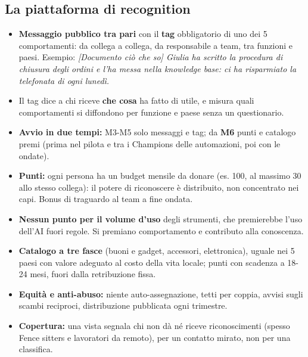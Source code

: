 \documentclass[11pt,a4paper]{article}
\begin{document}
\subsection{La piattaforma di recognition}\label{sec:13.3}
\begin{itemize}
\item \textbf{Messaggio pubblico tra pari} con il \textbf{tag} obbligatorio di uno dei 5 comportamenti: da collega a collega, da responsabile a team, tra funzioni e paesi. Esempio: \emph{[Documento ciò che so] \guillemotleft{}Giulia ha scritto la procedura di chiusura degli ordini e l'ha messa nella knowledge base: ci ha risparmiato la telefonata di ogni lunedì.\guillemotright{}}
\item Il tag dice a chi riceve \textbf{che cosa} ha fatto di utile, e misura quali comportamenti si diffondono per funzione e paese senza un questionario.
\item \textbf{Avvio in due tempi:} M3-M5 solo messaggi e tag; da \textbf{M6} punti e catalogo premi (prima nel pilota e tra i Champions delle automazioni, poi con le ondate).
\item \textbf{Punti:} ogni persona ha un budget mensile da donare (es. 100, al massimo 30 allo stesso collega): il potere di riconoscere è distribuito, non concentrato nei capi. Bonus di traguardo al team a fine ondata.
\item \textbf{Nessun punto per il volume d'uso} degli strumenti, che premierebbe l'uso dell'AI fuori regole. Si premiano comportamento e contributo alla conoscenza.
\item \textbf{Catalogo a tre fasce} (buoni e gadget, accessori, elettronica), uguale nei 5 paesi con valore adeguato al costo della vita locale; punti con scadenza a 18-24 mesi, fuori dalla retribuzione fissa.
\item \textbf{Equità e anti-abuso:} niente auto-assegnazione, tetti per coppia, avvisi sugli scambi reciproci, distribuzione pubblicata ogni trimestre.
\item \textbf{Copertura:} una vista segnala chi non dà né riceve riconoscimenti (spesso Fence sitters e lavoratori da remoto), per un contatto mirato, non per una classifica.
\end{itemize}
\end{document}

